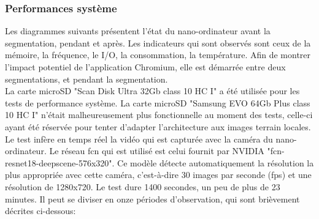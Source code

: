 \subsubsection{Performances système}
\noindent Les diagrammes suivants présentent l'état du nano-ordinateur avant la segmentation, pendant et après. Les indicateurs qui sont observés sont ceux de la mémoire, la fréquence, le I/O, la consommation, la température. Afin de montrer l'impact potentiel de l'application Chromium, elle est démarrée entre deux segmentations, et pendant la segmentation. 
\vspace{0.5\baselineskip}
\\
\noindent La carte microSD "Scan Disk Ultra 32Gb class 10 HC I" a été utilisée pour les tests de performance système. La carte microSD "Samsung EVO 64Gb Plus class 10 HC I" n'était malheureusement plus fonctionnelle au moment des tests, celle-ci ayant été réservée pour tenter d'adapter l'architecture aux images terrain locales. 
\vspace{0.5\baselineskip}
\\
\noindent Le test infère en temps réel la vidéo qui est capturée avec la caméra du nano-ordinateur. Le réseau \acrshort{fcn} qui est utilisé est celui fournit par NVIDIA "fcn-resnet18-deepscene-576x320". Ce modèle détecte automatiquement la résolution la plus appropriée avec cette caméra, c'est-à-dire 30 images par seconde (\acrshort{fps}) et une résolution de 1280x720. Le test dure 1400 secondes, un peu de plus de 23 minutes. Il peut se diviser en onze périodes d'observation, qui sont brièvement décrites ci-dessous: 
